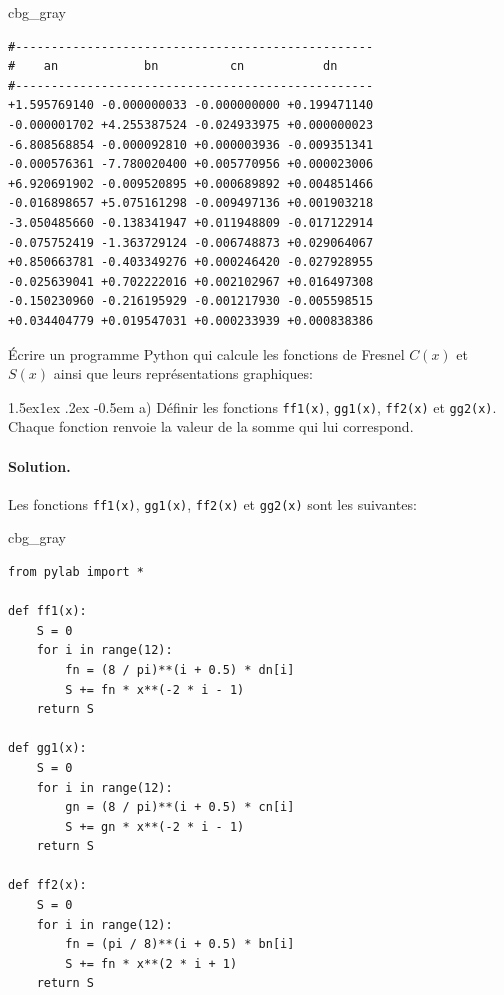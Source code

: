 \documentclass[%
oneside,                 %
final,                   %
10pt,french]{article}
\makeatletter
\newenvironment{_cod_tight}[1]{
   \def\FrameCommand{\colorbox{#1}}
   \FrameRule0.6pt\MakeFramed {\FrameRestore}\vskip3mm}
   {\vskip0mm\endMakeFramed}
\newenvironment{cod}[1]{
\bgroup\rmfamily
\fboxsep=0mm\relax
\begin{_cod_tight}{#1}
\list{}{\parsep=-2mm\parskip=0mm\topsep=0pt\leftmargin=2mm
\rightmargin=2\leftmargin\leftmargin=4pt\relax}
\item\relax}
{\endlist\end{_cod_tight}\egroup}
\newenvironment{doconceexercise}{}{}
\newcommand\subex{\@startsection{paragraph}{4}{\z@}%
                  {1.5ex\@plus1ex \@minus.2ex}%
                  {-0.5em}%
                  {\normalfont\normalsize\bfseries}}
\makeatother
\begin{document}
\begin{doconceexercise}
\begin{cod}{cbg_gray}\begin{verbatim}
#--------------------------------------------------
#    an            bn          cn           dn
#--------------------------------------------------
+1.595769140 -0.000000033 -0.000000000 +0.199471140
-0.000001702 +4.255387524 -0.024933975 +0.000000023
-6.808568854 -0.000092810 +0.000003936 -0.009351341
-0.000576361 -7.780020400 +0.005770956 +0.000023006
+6.920691902 -0.009520895 +0.000689892 +0.004851466
-0.016898657 +5.075161298 -0.009497136 +0.001903218
-3.050485660 -0.138341947 +0.011948809 -0.017122914
-0.075752419 -1.363729124 -0.006748873 +0.029064067
+0.850663781 -0.403349276 +0.000246420 -0.027928955
-0.025639041 +0.702222016 +0.002102967 +0.016497308
-0.150230960 -0.216195929 -0.001217930 -0.005598515
+0.034404779 +0.019547031 +0.000233939 +0.000838386
\end{verbatim}
\end{cod}
\noindent


Écrire un programme Python qui calcule les fonctions de Fresnel $C(x)$ et $S(x)$ ainsi que leurs représentations graphiques:


\subex{a)}
Définir les fonctions \texttt{ff1(x)}, \texttt{gg1(x)}, \texttt{ff2(x)} et \texttt{gg2(x)}. Chaque fonction renvoie la valeur de la somme qui lui correspond.


\paragraph{Solution.}
Les fonctions \texttt{ff1(x)}, \texttt{gg1(x)}, \texttt{ff2(x)} et \texttt{gg2(x)} sont les suivantes:
\begin{cod}{cbg_gray}\begin{verbatim}
from pylab import *

def ff1(x):
    S = 0
    for i in range(12):
        fn = (8 / pi)**(i + 0.5) * dn[i]
        S += fn * x**(-2 * i - 1)
    return S

def gg1(x):
    S = 0
    for i in range(12):
        gn = (8 / pi)**(i + 0.5) * cn[i]
        S += gn * x**(-2 * i - 1)
    return S

def ff2(x):
    S = 0
    for i in range(12):
        fn = (pi / 8)**(i + 0.5) * bn[i]
        S += fn * x**(2 * i + 1)
    return S


\end{verbatim}
\end{cod}
\end{doconceexercise}
\end{document}
